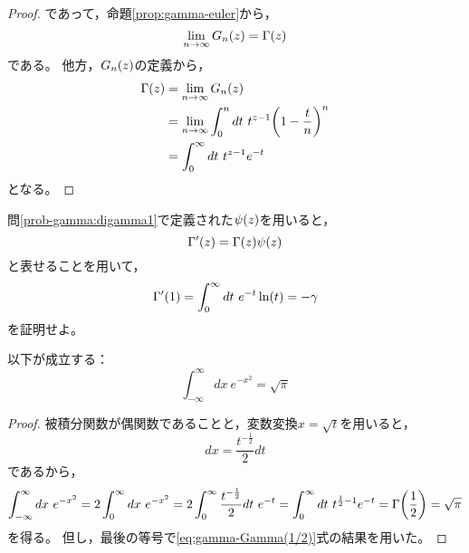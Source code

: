 \documentclass[a4paper,draft]{ltjsarticle}
\begin{document}
\begin{thm}
\begin{proof}
        であって，命題\ref{prop:gamma-euler}から，
        \begin{equation}
            \limn \fun{G_n}{z}=\fun{\Gamma}{z}
        \end{equation}
        である。
        他方，$\fun{G_n}{z}$の定義から，
        \begin{align}
            \fun{\Gamma}{z}&=\limn \fun{G_n}{z}
            \\
            &=\limn \int_0^n dt\ t^{z-1}\pare{1-\dfrac{t}{n}}^n
            \\
            &=\int_0^\infty dt\ t^{z-1}e^{-t}
        \end{align}
        となる。
    \end{proof}
\end{thm}

\begin{prob}\label{prob-gamma:digamma2}
    問\ref{prob-gamma:digamma1}で定義された$\fun{\psi}{z}$を用いると，
    \begin{equation}
        \fun{\Gamma'}{z}=\fun{\Gamma}{z}\fun{\psi}{z}
    \end{equation}
    と表せることを用いて，
    \begin{equation}
        \fun{\Gamma'}{1}=\int_0^\infty dt\ e^{-t}\fun{\ln}{t}=-\gamma
    \end{equation}
    を証明せよ。
\end{prob}

\begin{prop}[Gauss積分]\label{prop:gamma-Gauss積分}
    以下が成立する：
    \begin{equation}
        \int_{-\infty}^\infty dx\ e^{-x^2}=\sqrt{\pi}
    \end{equation}
    \begin{proof}
        被積分関数が偶関数であることと，変数変換$x=\sqrt{t}$を用いると，
        \begin{equation}
            dx = \frac{t^{-\frac{1}{2}}}{2} dt
        \end{equation}
        であるから，
        \begin{equation}
            \int_{-\infty}^\infty dx\ e^{-x^2}
            =2\int_0^\infty dx\ e^{-x^2}
            =2\int_0^\infty \frac{t^{-\frac{1}{2}}}{2}dt\ e^{-t}
            =\int_0^\infty dt\ t^{\frac{1}{2}-1}e^{-t}
            =\fun{\Gamma}{\frac{1}{2}}=\sqrt{\pi}
        \end{equation}
        を得る。
        但し，最後の等号で\eqref{eq:gamma-Gamma(1/2)}式の結果を用いた。
    \end{proof}
\end{prop}
\end{document}
